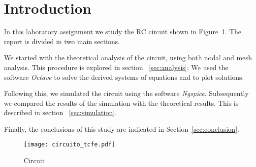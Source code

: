 \section{Introduction}
\label{sec:introduction}

In this laboratory assignment we study the RC circuit 
shown in Figure~\ref{fig:circuit}. The report is divided in two main 
sections.

We started with the theoretical analysis of the circuit, 
using both nodal and mesh analysis. 
This procedure is explored in section ~\ref{sec:analysis};
We used the software \textit{Octave} to solve the derived systems 
of equations and to plot solutions.

Following this, we simulated the circuit using the software 
\textit{Ngspice}. Subsequently we compared the results of the 
simulation with the theoretical results. 
This is described in section ~\ref{sec:simulation}.

Finally, the conclusions of this study are indicated in
Section~\ref{sec:conclusion}.

\begin{figure}[ht] \centering
    \texttt{[image: circuito\_tcfe.pdf]}
    \caption{Circuit}
    \label{fig:circuit}
\end{figure}

